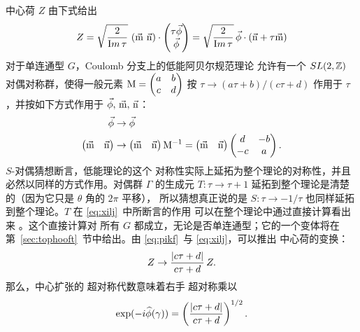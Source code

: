 中心荷 $Z$ 由下式给出 %
\setcounter{equation}{21}
\begin{equation}\label{eq:pikf}
Z=\sqrt{2\over {\rm
Im}\,\tau}\,\left(\vec{\eurm m}~\vec{\eurm n}\right)\cdot
\left(\begin{matrix}\tau\vec \phi \\\vec \phi \\\end{matrix}\right)=\sqrt {2\over
{\rm Im}\,\tau}\,\vec \phi\cdot (\vec{\eurm n}+\tau \vec{\eurm m})
\end{equation}
对于单连通型 $G$，Coulomb 分支上的低能阿贝尔规范理论
允许有一个 $SL(2,\Bbb{Z})$ 对偶对称群，使得一般元素
$\eurm M=\left(\begin{matrix}a&b\\ c&d\\\end{matrix}\right)$ 按
$\tau\to (a\tau+b)/(c\tau+d)$ 作用于 $\tau$，并按如下方式作用于 $\vec{\phi},\,
\vec{{\eurm m}},\, \vec{{\eurm n}} $：
\setcounter{equation}{22}
\begin{equation}\label{eq:xilj}
\begin{aligned}\vec{\phi} & \to
\vec{\phi}\\\left(\begin{matrix}\vec{{\eurm m}} & \vec{{\eurm
n}}\end{matrix}\right)&\to \left(\begin{matrix}\vec{{\eurm m}} & \vec{{\eurm
n}}\end{matrix}\right){\eurm M}^{-1}=\left(\begin{matrix} \vec{{\eurm m}} &
\vec{{\eurm n}}\end{matrix}\right)\left(\begin{matrix}d & -b  \\ -c & a
\\\end{matrix}\right).\end{aligned}
\end{equation}
$S$-对偶猜想断言，低能理论的这个
对称性实际上延拓为整个理论的对称性，并且必然以同样的方式作用。对偶群 $\Gamma$ 的生成元
$T:\tau\to\tau+1$ 延拓到整个理论是清楚的（因为它只是 $\theta$ 角的 $2\pi$ 平移），
所以猜想真正说的是 $S:\tau\to
-1/\tau$ 也同样延拓到整个理论。$T$ 在 \eqref{eq:xilj}\ 中所断言的作用
可以在整个理论中通过直接计算看出来 \cite{ref50}。这个直接计算对
所有 $G$ 都成立，无论是否单连通型；它的一个变体将在
第~\ref{sec:tophooft}~节中给出。由 \eqref{eq:pikf}\ 与 \eqref{eq:xilj}，可以推出
中心荷的变换： %
\setcounter{equation}{23}
\begin{equation}\label{eq:mujk}
Z\to
{|c\tau+d|\over {c\tau+d}}\, Z.
\end{equation}
那么，中心扩张的
超对称代数意味着右手
超对称乘以
\setcounter{equation}{24}
\begin{equation}\label{eq:tokio}
\exp(-i\hat\phi(\gamma))=\left({|c\tau+d|\over
{c\tau+d}}\right)^{1/2}.
\end{equation}

